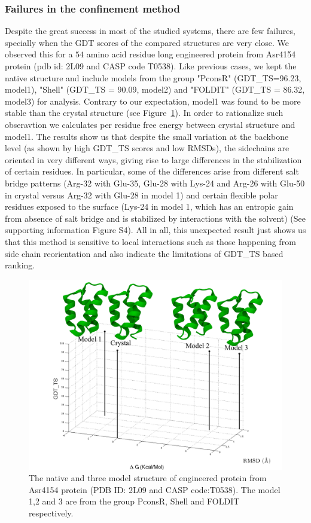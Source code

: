 \documentclass[12pt]{article}
\begin{document}
\subsubsection{Failures in the confinement method}

Despite the great success in most of the studied systems, there are few failures, specially when
the GDT scores of the compared structures are very close. We observed this for a $54$ amino acid residue long
 engineered protein from Asr4154 protein (pdb id: 2L09 and CASP code T0538).
Like previous cases, we kept the native structure and include models from the group "PconsR" (GDT\_TS=96.23, model1),
"Shell" (GDT\_TS = 90.09, model2) and "FOLDIT" (GDT\_TS = 86.32, model3) for analysis. 
Contrary to our expectation, model1 was found to be more stable than the crystal structure 
(see Figure~\ref{fig:T0538}). In order to rationalize such obseravtion we calculates per residue free energy
between crystal structure and model1. The results show us that despite the small variation at the backbone level (as
shown by high GDT\_TS scores and low RMSDs), the sidechains are oriented in very different ways,
giving rise to large differences in the stabilization of certain residues. In particular, some of
the differences arise from different salt bridge patterns (Arg-32 with Glu-35, Glu-28 with Lys-24 and Arg-26 with Glu-50
in crystal versus Arg-32 with Glu-28 in model 1) and certain flexible polar residues exposed to the
surface (Lys-24 in model 1, which has an entropic gain from absence of salt bridge and is
stabilized by interactions with the solvent) (See supporting information Figure S4). All in all, this
unexpected result just shows us that this method is sensitive to local interactions such as those
happening from side chain reorientation and also indicate the limitations of GDT\_TS based ranking. 

\begin{figure}
\begin{center}
\includegraphics[width=3.6 in,height=3.4 in]{T0538.pdf}
\end{center}
\caption{The native and three model structure of engineered protein from Asr4154 protein (PDB ID: 2L09 and CASP code:T0538). The model 1,2 and 3 are
from the group PconsR, Shell and FOLDIT respectively.}
\label{fig:T0538}
\end{figure}
\end{document}
